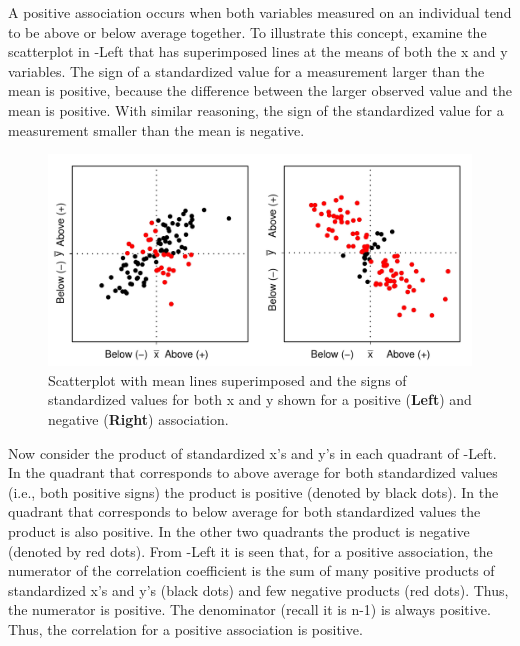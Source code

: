 \documentclass[10pt,openany]{book}\usepackage[]{graphicx}\usepackage[]{color}
\newenvironment{knitrout}{}{} %
\begin{document}
A positive association occurs when both variables measured on an individual tend to be above or below average together.  To illustrate this concept, examine the scatterplot in -Left that has superimposed lines at the means of both the x and y variables.  The sign of a standardized value for a measurement larger than the mean is positive, because the difference between the larger observed value and the mean is positive.  With similar reasoning, the sign of the standardized value for a measurement smaller than the mean is negative.

\begin{knitrout}
\color{fgcolor}\begin{figure}[hbtp]

{\centering \includegraphics[width=.8\linewidth]{Figs/corrdefn1-1} 

}

\caption[Scatterplot with mean lines superimposed and the signs of standardized values for both x and y shown for a positive (\textbf{Left}) and negative (\textbf{Right}) association]{Scatterplot with mean lines superimposed and the signs of standardized values for both x and y shown for a positive (\textbf{Left}) and negative (\textbf{Right}) association.}\label{fig:corrdefn1}
\end{figure}


\end{knitrout}

Now consider the product of standardized x's and y's in each quadrant of -Left.  In the quadrant that corresponds to above average for both standardized values (i.e., both positive signs) the product is positive (denoted by black dots).  In the quadrant that corresponds to below average for both standardized values the product is also positive.  In the other two quadrants the product is negative (denoted by red dots).  From -Left it is seen that, for a positive association, the numerator of the correlation coefficient is the sum of many positive products of standardized x's and y's (black dots) and few negative products (red dots).  Thus, the numerator is positive.  The denominator (recall it is n-1) is always positive.  Thus, the correlation for a positive association is positive.
\end{document}
